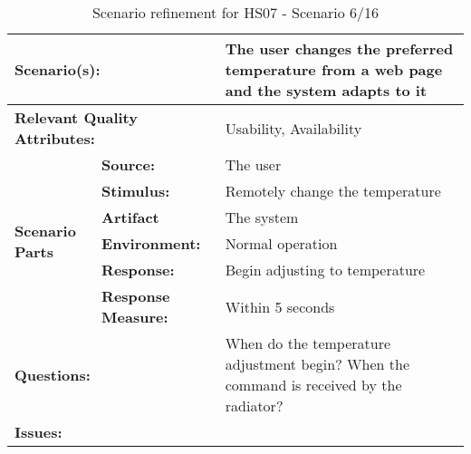 \documentclass[10pt,a4paper]{article}
\begin{document}
\begin{table}[!htp]
\begin{center}
\begin{tabular}{|p{0.3cm}|p{2.5cm}|p{8cm}|}
  \hline
  \multicolumn{2}{|p{3cm}|}{\bfseries Scenario(s):} & The user changes the preferred temperature from a web page and the system adapts to it \\
  \hline
  \multicolumn{2}{|p{3cm}|}{\bfseries Relevant Quality Attributes:} & Usability,  Availability \\
  \hline
  \multirow{6}{*}{\begin{sideways}{\bfseries Scenario Parts}\end{sideways}}
  & {\bfseries Source:} & The user \\
  \cline{2-3}
  & {\bfseries Stimulus:} & Remotely change the temperature \\
  \cline{2-3}
  & {\bfseries Artifact} & The system \\
  \cline{2-3}
  & {\bfseries Environment:} & Normal operation \\
  \cline{2-3}
  & {\bfseries Response:} & Begin adjusting to temperature \\
  \cline{2-3}
  & {\bfseries Response Measure:} & Within 5 seconds \\
  \hline
  \multicolumn{2}{|p{3cm}|}{\bfseries Questions:} & When do the temperature adjustment begin? When the command is received by the radiator? \\
  \hline
  \multicolumn{2}{|p{3cm}|}{\bfseries Issues:} &  \\
  \hline
\end{tabular}
\caption{Scenario refinement for HS07 - Scenario 6/16}
\end{center}
\end{table}
\end{document}
